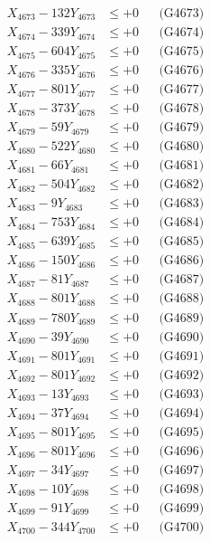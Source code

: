\documentclass[a4paper,10pt]{article}
\begin{document}
{\begin{align}
X_{4673} - 132Y_{4673} &\leq +0 && \text{(G4673)} \\
X_{4674} - 339Y_{4674} &\leq +0 && \text{(G4674)} \\
X_{4675} - 604Y_{4675} &\leq +0 && \text{(G4675)} \\
X_{4676} - 335Y_{4676} &\leq +0 && \text{(G4676)} \\
X_{4677} - 801Y_{4677} &\leq +0 && \text{(G4677)} \\
X_{4678} - 373Y_{4678} &\leq +0 && \text{(G4678)} \\
X_{4679} - 59Y_{4679} &\leq +0 && \text{(G4679)} \\
X_{4680} - 522Y_{4680} &\leq +0 && \text{(G4680)} \\
\allowbreak
X_{4681} - 66Y_{4681} &\leq +0 && \text{(G4681)} \\
X_{4682} - 504Y_{4682} &\leq +0 && \text{(G4682)} \\
X_{4683} - 9Y_{4683} &\leq +0 && \text{(G4683)} \\
X_{4684} - 753Y_{4684} &\leq +0 && \text{(G4684)} \\
X_{4685} - 639Y_{4685} &\leq +0 && \text{(G4685)} \\
X_{4686} - 150Y_{4686} &\leq +0 && \text{(G4686)} \\
X_{4687} - 81Y_{4687} &\leq +0 && \text{(G4687)} \\
X_{4688} - 801Y_{4688} &\leq +0 && \text{(G4688)} \\
X_{4689} - 780Y_{4689} &\leq +0 && \text{(G4689)} \\
X_{4690} - 39Y_{4690} &\leq +0 && \text{(G4690)} \\
\allowbreak
X_{4691} - 801Y_{4691} &\leq +0 && \text{(G4691)} \\
X_{4692} - 801Y_{4692} &\leq +0 && \text{(G4692)} \\
X_{4693} - 13Y_{4693} &\leq +0 && \text{(G4693)} \\
X_{4694} - 37Y_{4694} &\leq +0 && \text{(G4694)} \\
X_{4695} - 801Y_{4695} &\leq +0 && \text{(G4695)} \\
X_{4696} - 801Y_{4696} &\leq +0 && \text{(G4696)} \\
X_{4697} - 34Y_{4697} &\leq +0 && \text{(G4697)} \\
X_{4698} - 10Y_{4698} &\leq +0 && \text{(G4698)} \\
X_{4699} - 91Y_{4699} &\leq +0 && \text{(G4699)} \\
X_{4700} - 344Y_{4700} &\leq +0 && \text{(G4700)} \\

\end{align}}
\end{document}
